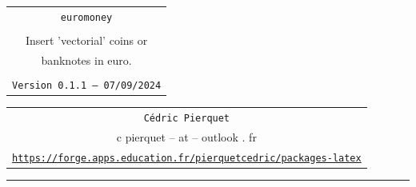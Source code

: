 \documentclass[11pt,a4paper]{ltxdoc}
\def\TPversion{0.1.1}
\def\TPdate{07/09/2024}
\begin{document}
\thispagestyle{empty}

\begin{center}
	\begin{minipage}{0.88\linewidth}
		\begin{tcolorbox}[colframe=yellow,colback=yellow!15]
			\begin{center}
				\begin{tabular}{c}
					{\Huge \texttt{euromoney}}\\
					\\
					{\LARGE Insert 'vectorial' coins or} \\
					{\LARGE banknotes in euro.} \\
					\\
					{\small \texttt{Version \TPversion{} -- \TPdate}}
				\end{tabular}
			\end{center}
		\end{tcolorbox}
	\end{minipage}
\end{center}

\begin{center}
	\begin{tabular}{c}
		\texttt{Cédric Pierquet}\\
		{\ttfamily c pierquet -- at -- outlook . fr}\\
		\texttt{\url{https://forge.apps.education.fr/pierquetcedric/packages-latex}} \\
	\end{tabular}
\end{center}

\hrule

\vfill

\begin{tcolorbox}[colframe=lightgray,colback=lightgray!5]
	\begin{center}
		
		\vspace*{2.5mm}
		
		
		\vspace*{2.5mm}
		
		
		\vspace*{2.5mm}
		
	\end{center}
\end{tcolorbox}
\end{document}

